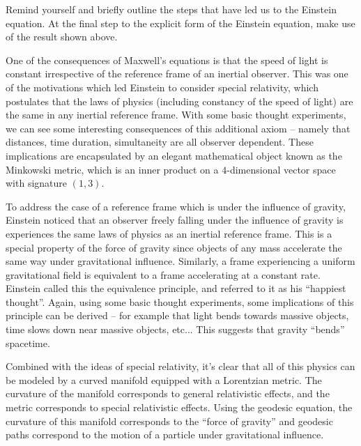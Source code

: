 \documentclass{../../templates/lkx_pset}
\begin{document}
\begin{problem}{6}
  Remind yourself and briefly outline the steps that have led us to the Einstein equation. At the final step to the explicit form of the Einstein equation, make use of the result shown above.
\end{problem}

\begin{solution}
  One of the consequences of Maxwell's equations is that the speed of light is constant irrespective of the reference frame of an inertial observer. This was one of the motivations which led Einstein to consider special relativity, which postulates that the laws of physics (including constancy of the speed of light) are the same in any inertial reference frame. With some basic thought experiments, we can see some interesting consequences of this additional axiom -- namely that distances, time duration, simultaneity are all observer dependent. These implications are encapsulated by an elegant mathematical object known as the Minkowski metric, which is an inner product on a $4$-dimensional vector space with signature $(1,3)$.

  To address the case of a reference frame which is under the influence of gravity, Einstein noticed that an observer freely falling under the influence of gravity is experiences the same laws of physics as an inertial reference frame. This is a special property of the force of gravity since objects of any mass accelerate the same way under gravitational influence. Similarly, a frame experiencing a uniform gravitational field is equivalent to a frame accelerating at a constant rate. Einstein called this the equivalence principle, and referred to it as his ``happiest thought''. Again, using some basic thought experiments, some implications of this principle can be derived -- for example that light bends towards massive objects, time slows down near massive objects, etc...
  This suggests that gravity ``bends'' spacetime.

  Combined with the ideas of special relativity, it's clear that all of this physics can be modeled by a curved manifold equipped with a Lorentzian metric. The curvature of the manifold corresponds to general relativistic effects, and the metric corresponds to special relativistic effects. Using the geodesic equation, the curvature of this manifold corresponds to the ``force of gravity'' and geodesic paths correspond to the motion of a particle under gravitational influence.


\end{solution}
\end{document}

